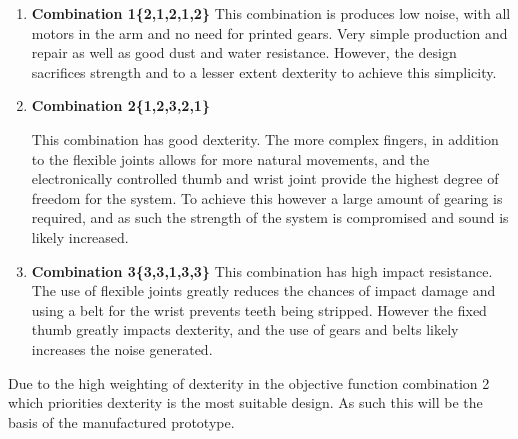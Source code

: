 \documentclass[11pt,3p]{report}
\begin{document}
\begin{enumerate}
	\item \textbf{Combination 1\{2,1,2,1,2\}} {
	This combination is produces low noise, with all motors in the arm and no need for printed gears. Very simple production and repair as well as good dust and water resistance. However, the design sacrifices strength and to a lesser extent dexterity to achieve this simplicity.
	}
\item \textbf{Combination 2\{1,2,3,2,1\}} {
	This combination has good dexterity. The more complex fingers, in addition to the flexible joints allows for more natural movements, and the electronically controlled thumb and wrist joint provide the highest degree of freedom for the system. To achieve this however a large amount of gearing is required, and as such the strength of the system is compromised and sound is likely increased.

	}
\item \textbf{Combination 3\{3,3,1,3,3\}} {
	This combination has high impact resistance. The use of flexible joints greatly reduces the chances of impact damage and using a belt for the wrist prevents teeth being stripped. However the fixed thumb greatly impacts dexterity, and the use of gears and belts likely increases the noise generated.
	}

\end{enumerate}

Due to the high weighting of dexterity in the objective function combination 2 which priorities dexterity is the most suitable design. As such this will be the basis of the manufactured prototype.


\pagebreak
\end{document}
